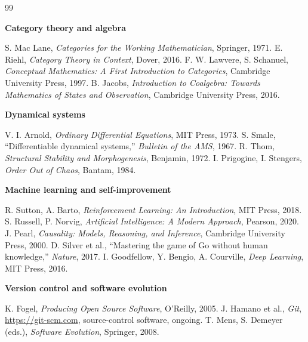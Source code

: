 \documentclass[11pt]{book}
\begin{document}
\begin{thebibliography}{99}
\item[] \textbf{Category theory and algebra}

 S. Mac Lane, \textit{Categories for the Working Mathematician}, Springer, 1971.
 E. Riehl, \textit{Category Theory in Context}, Dover, 2016.
 F. W. Lawvere, S. Schanuel, \textit{Conceptual Mathematics: A First Introduction to Categories}, Cambridge University Press, 1997.
 B. Jacobs, \textit{Introduction to Coalgebra: Towards Mathematics of States and Observation}, Cambridge University Press, 2016.

\item[] \textbf{Dynamical systems}

 V. I. Arnold, \textit{Ordinary Differential Equations}, MIT Press, 1973.
 S. Smale, ``Differentiable dynamical systems,'' \textit{Bulletin of the AMS}, 1967.
 R. Thom, \textit{Structural Stability and Morphogenesis}, Benjamin, 1972.
 I. Prigogine, I. Stengers, \textit{Order Out of Chaos}, Bantam, 1984.

\item[] \textbf{Machine learning and self-improvement}

 R. Sutton, A. Barto, \textit{Reinforcement Learning: An Introduction}, MIT Press, 2018.
 S. Russell, P. Norvig, \textit{Artificial Intelligence: A Modern Approach}, Pearson, 2020.
 J. Pearl, \textit{Causality: Models, Reasoning, and Inference}, Cambridge University Press, 2000.
 D. Silver et al., ``Mastering the game of Go without human knowledge,'' \textit{Nature}, 2017.
 I. Goodfellow, Y. Bengio, A. Courville, \textit{Deep Learning}, MIT Press, 2016.

\item[] \textbf{Version control and software evolution}

 K. Fogel, \textit{Producing Open Source Software}, O'Reilly, 2005.
 J. Hamano et al., \textit{Git}, \url{https://git-scm.com}, source-control software, ongoing.
 T. Mens, S. Demeyer (eds.), \textit{Software Evolution}, Springer, 2008.

\end{thebibliography}
\end{document}
